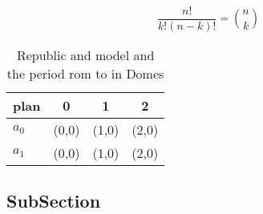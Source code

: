 \documentclass[a4paper]{article}
\begin{document}
\[ \frac{n!}{k!(n-k)!} = \binom{n}{k} \]

\begin{table}
\begin{adjustbox}{width=0.6\columnwidth}
\begin{tabular}{|l|l|l|l|}
\hline
\textbf{plan} & \multicolumn{1}{c|}{\textbf{0}} & \multicolumn{1}{c|}{\textbf{1}} & \multicolumn{1}{c|}{\textbf{2}} \\ \hline
\textbf{$a_0$}  & (0,0) & (1,0) & (2,0) \\ \hline
\textbf{$a_1$}  & (0,0) & (1,0) & (2,0) \\ \hline
\end{tabular}
\end{adjustbox}
\caption{Republic and model and the period rom to in Domes
}
\end{table}

\subsection{SubSection}
\end{document}
